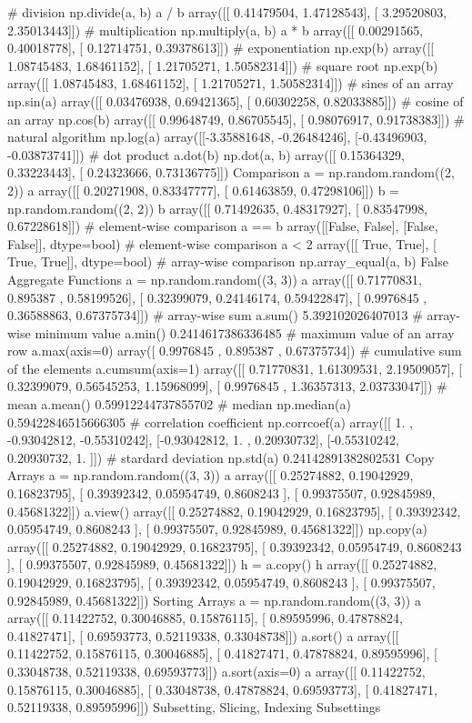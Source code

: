 # division
np.divide(a, b)
a / b
array([[ 0.41479504, 1.47128543], [ 3.29520803, 2.35013443]])
# multiplication
np.multiply(a, b)
a * b
array([[ 0.00291565, 0.40018778], [ 0.12714751, 0.39378613]])
# exponentiation
np.exp(b)
array([[ 1.08745483, 1.68461152], [ 1.21705271, 1.50582314]])
# square root
np.exp(b)
array([[ 1.08745483, 1.68461152], [ 1.21705271, 1.50582314]])
# sines of an array
np.sin(a)
array([[ 0.03476938, 0.69421365], [ 0.60302258, 0.82033885]])
# cosine of an array
np.cos(b)
array([[ 0.99648749, 0.86705545], [ 0.98076917, 0.91738383]])
# natural algorithm
np.log(a)
array([[-3.35881648, -0.26484246], [-0.43496903, -0.03873741]])
# dot product
a.dot(b)
np.dot(a, b)
array([[ 0.15364329, 0.33223443], [ 0.24323666, 0.73136775]])
Comparison
a = np.random.random((2, 2))
a
array([[ 0.20271908, 0.83347777], [ 0.61463859, 0.47298106]])
b = np.random.random((2, 2))
b
array([[ 0.71492635, 0.48317927], [ 0.83547998, 0.67228618]])
# element-wise comparison
a == b
array([[False, False], [False, False]], dtype=bool)
# element-wise comparison
a < 2
array([[ True, True], [ True, True]], dtype=bool)
# array-wise comparison
np.array_equal(a, b)
False
Aggregate Functions
a = np.random.random((3, 3))
a
array([[ 0.71770831, 0.895387 , 0.58199526], [ 0.32399079, 0.24146174, 0.59422847], [ 0.9976845 , 0.36588863, 0.67375734]])
# array-wise sum
a.sum()
5.392102026407013
# array-wise minimum value
a.min()
0.2414617386336485
# maximum value of an array row
a.max(axis=0)
array([ 0.9976845 , 0.895387 , 0.67375734])
# cumulative sum of the elements
a.cumsum(axis=1)
array([[ 0.71770831, 1.61309531, 2.19509057], [ 0.32399079, 0.56545253, 1.15968099], [ 0.9976845 , 1.36357313, 2.03733047]])
# mean
a.mean()
0.59912244737855702
# median
np.median(a)
0.59422846515666305
# correlation coefficient
np.corrcoef(a)
array([[ 1. , -0.93042812, -0.55310242], [-0.93042812, 1. , 0.20930732], [-0.55310242, 0.20930732, 1. ]])
# stardard deviation
np.std(a)
0.24142891382802531
Copy Arrays
a = np.random.random((3, 3))
a
array([[ 0.25274882, 0.19042929, 0.16823795], [ 0.39392342, 0.05954749, 0.8608243 ], [ 0.99375507, 0.92845989, 0.45681322]])
a.view()
array([[ 0.25274882, 0.19042929, 0.16823795], [ 0.39392342, 0.05954749, 0.8608243 ], [ 0.99375507, 0.92845989, 0.45681322]])
np.copy(a)
array([[ 0.25274882, 0.19042929, 0.16823795], [ 0.39392342, 0.05954749, 0.8608243 ], [ 0.99375507, 0.92845989, 0.45681322]])
h = a.copy()
h
array([[ 0.25274882, 0.19042929, 0.16823795], [ 0.39392342, 0.05954749, 0.8608243 ], [ 0.99375507, 0.92845989, 0.45681322]])
Sorting Arrays
a = np.random.random((3, 3))
a
array([[ 0.11422752, 0.30046885, 0.15876115], [ 0.89595996, 0.47878824, 0.41827471], [ 0.69593773, 0.52119338, 0.33048738]])
a.sort()
a
array([[ 0.11422752, 0.15876115, 0.30046885], [ 0.41827471, 0.47878824, 0.89595996], [ 0.33048738, 0.52119338, 0.69593773]])
a.sort(axis=0)
a
array([[ 0.11422752, 0.15876115, 0.30046885], [ 0.33048738, 0.47878824, 0.69593773], [ 0.41827471, 0.52119338, 0.89595996]])
Subsetting, Slicing, Indexing
Subsettings

